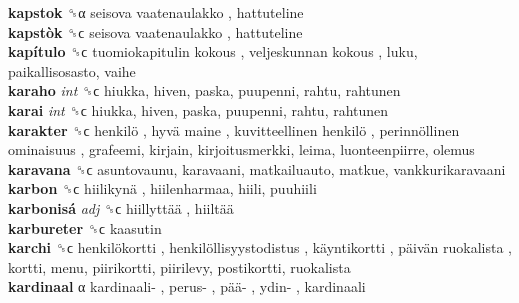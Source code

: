 \textbf{kapstok} ␝α   seisova vaatenaulakko , hattuteline  \\
\textbf{kapstòk} ␝ϲ   seisova vaatenaulakko , hattuteline  \\
\textbf{kapítulo} ␝ϲ   tuomiokapitulin kokous ,  veljeskunnan kokous , luku, paikallisosasto, vaihe  \\
\textbf{karaho} \emph{int}  ␝ϲ  hiukka, hiven, paska, puupenni, rahtu, rahtunen  \\
\textbf{karai} \emph{int}  ␝ϲ  hiukka, hiven, paska, puupenni, rahtu, rahtunen  \\
\textbf{karakter} ␝ϲ   henkilö ,  hyvä maine ,  kuvitteellinen henkilö ,  perinnöllinen ominaisuus , grafeemi, kirjain, kirjoitusmerkki, leima, luonteenpiirre, olemus  \\
\textbf{karavana} ␝ϲ  asuntovaunu, karavaani, matkailuauto, matkue, vankkurikaravaani  \\
\textbf{karbon} ␝ϲ   hiilikynä , hiilenharmaa, hiili, puuhiili  \\
\textbf{karbonisá} \emph{adj}  ␝ϲ   hiillyttää ,  hiiltää   \\
\textbf{karbureter} ␝ϲ  kaasutin  \\
\textbf{karchi} ␝ϲ   henkilökortti ,  henkilöllisyystodistus ,  käyntikortti ,  päivän ruokalista , kortti, menu, piirikortti, piirilevy, postikortti, ruokalista  \\
\textbf{kardinaal} α   kardinaali- ,  perus- ,  pää- ,  ydin- , kardinaali  \\
